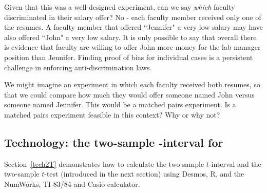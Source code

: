 \begin{examplewrap}
\begin{nexample}{Given that this was a well-designed experiment, can we say \emph{which} faculty discriminated in their salary offer?}
No - each faculty member received only one of the resumes.  A faculty member that offered ``Jennifer" a very low salary may have also offered ``John" a very low salary.  It is only possible to say that overall there is evidence that faculty are willing to offer John more money for the lab manager position than Jennifer.  Finding proof of bias for individual cases is a persistent challenge in enforcing anti-discrimination laws.\end{nexample}
\end{examplewrap}

\begin{exercisewrap}
\begin{nexercise}
We might imagine an experiment in which each faculty received both resumes, so that we could compare how much they would offer someone named John versus someone named Jennifer.  This would be a matched pairs experiment.  Is a matched pairs experiment feasible in this context?  Why or why not?\footnotemark 
\end{nexercise}
\end{exercisewrap}


\subsection[Technology: the two-sample $t$-interval for $\mu_1 - \mu_2$]{Technology: the two-sample -interval for }
\label{2SampTint}

\noindent Section~\ref{tech2T} demonstrates how to calculate the two-sample $t$-interval and the two-sample $t$-test (introduced in the next section) using Desmos, R, and the NumWorks, TI-83/84 and Casio calculator. 

\D{\newpage}

